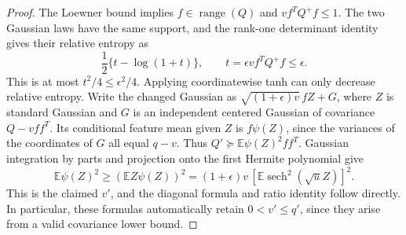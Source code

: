 \begin{proof}
The Loewner bound implies $f\in\operatorname{range}(Q)$ and
$v f^TQ^+f\le1$. The two Gaussian laws have the same support, and the
rank-one determinant identity gives their relative entropy as
\[
 \frac12\{t-\log(1+t)\},\qquad
 t=\epsilon v f^TQ^+f\le\epsilon.
\]
This is at most $t^2/4\le\epsilon^2/4$. Applying coordinatewise tanh
can only decrease relative entropy.
Write the changed Gaussian as
$\sqrt{(1+\epsilon)v}\,fZ+G$, where $Z$ is standard Gaussian and
$G$ is an independent centered Gaussian of covariance $Q-vff^T$.
Its conditional feature mean given $Z$ is $f\psi(Z)$, since the
variances of the coordinates of $G$ all equal $q-v$.
Thus $Q'\succeq\mathbb E\psi(Z)^2 ff^T$.
Gaussian integration by parts and projection onto the first Hermite
polynomial give
\[
 \mathbb E\psi(Z)^2\ge(\mathbb E Z\psi(Z))^2
     =(1+\epsilon)v\,[\mathbb E\operatorname{sech}^2(\sqrt u Z)]^2.
\]
This is the claimed $v'$, and the diagonal formula and ratio identity
follow directly. In particular, these formulas automatically retain
$0<v'\le q'$, since they arise from a valid covariance lower bound.
\end{proof}

